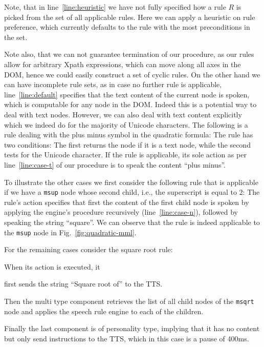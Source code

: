 \documentclass{sig-alternate}
\begin{document}
Note, that in line~\ref{line:heuristic} we have not fully specified how a rule
$R$ is picked from the set of all applicable rules. Here we can apply a
heuristic on rule preference, which currently defaults to the rule with the most
preconditions in the set.

Note also, that we can not guarantee termination of our procedure, as our rules
allow for arbitrary Xpath expressions, which can move along all axes in the DOM,
hence we could easily construct a set of cyclic rules. On the other hand we can
have incomplete rule sets, as in case no further rule is applicable,
line~\ref{line:default} specifies that the text content of the current node is
spoken, which is computable for any node in the DOM. Indeed this is a potential
way to deal with text nodes. However, we can also deal with text content
explicitly which we indeed do for the majority of Unicode characters.  The
following is a rule dealing with the plus minus symbol in the quadratic formula:
 The rule has two
conditions: The first returns the node if it is a text node, while the second
tests for the Unicode character. If the rule is applicable, its sole action as
per line~\ref{line:case-t} of our procedure is to speak the content ``plus
minus''.

To illustrate the other cases we first consider the following rule that is
applicable if we have a \texttt{msup} node whose second child, i.e., the
superscript is equal to $2$:  The rule's action specifies that first the content of the
first child node is spoken by applying the engine's procedure recursively
(line~\ref{line:case-n}), followed by speaking the string ``square''.  We can
observe that the rule is indeed applicable to the \texttt{msup} node in
Fig.~\ref{fig:quadratic-mml}.

For the remaining cases  consider the square root rule:

\noindent When its action is executed, it
\begin{inparaenum}[(1)]
\item first sends the string ``Square root of'' to the TTS.
\item Then the multi type component retrieves the list of all child nodes of the
  \texttt{msqrt} node and applies the speech rule engine to each of the children.
\item Finally the last component is of personality type, implying that it
  has no content but only send instructions to the TTS, which in this case is a
  pause of 400ms.
\end{inparaenum}
\end{document}
